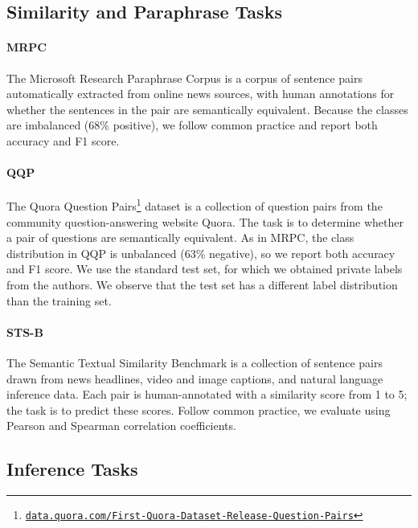 \documentclass{article} \usepackage{iclr2019_conference,times}
\begin{document}
\subsection{Similarity and Paraphrase Tasks}

\paragraph{MRPC}
The Microsoft Research Paraphrase Corpus \citep{dolan2005automatically} is a corpus of sentence pairs automatically extracted from online news sources, with human annotations for whether the sentences in the pair are semantically equivalent. Because the classes are imbalanced (68\% positive), we follow common practice and report both accuracy and F1 score.

\paragraph{QQP}
The Quora Question Pairs\footnote{ \href{https://data.quora.com/First-Quora-Dataset-Release-Question-Pairs}{\texttt{data.quora.com/\allowbreak First-\allowbreak Quora-\allowbreak Dataset-\allowbreak Release-Question-Pairs}}} dataset is a collection of question pairs from the community question-answering website Quora. The task is to determine whether a pair of questions are semantically equivalent. As in MRPC, the class distribution in QQP is unbalanced (63\% negative), so we report both accuracy and F1 score. We use the standard test set, for which we obtained private labels from the authors. We observe that the test set has a different label distribution than the training set.

\paragraph{STS-B}
The Semantic Textual Similarity Benchmark \citep{cer2017semeval} is a collection of sentence pairs drawn from news headlines, video and image captions, and natural language inference data. 
Each pair is human-annotated with a similarity score from 1 to 5; the task is to predict these scores.
Follow common practice, we evaluate using Pearson and Spearman correlation coefficients.

\subsection{Inference Tasks}
\end{document}
